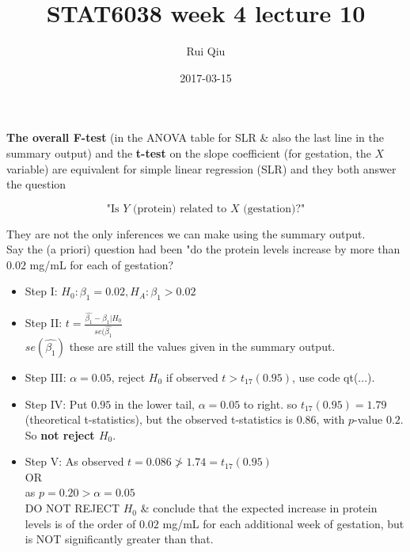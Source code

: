 \documentclass[a4paper, 11pt, twoside]{article}
\begin{document}
\title{STAT6038 week 4 lecture 10}
\author{Rui Qiu}
\date{2017-03-15}

\maketitle

\textbf{The overall F-test} (in the ANOVA table for SLR \& also the last line in the summary output) and the \textbf{t-test} on the slope coefficient (for gestation, the $X$ variable) are equivalent for simple linear regression (SLR) and they both answer the question

\[\text{"Is $Y$ (protein) related to $X$ (gestation)?"}\]

They are not the only inferences we can make using the summary output.\\

Say the (a priori) question had been "do the protein levels increase by more than $0.02$ mg/mL for each of gestation?

\begin{itemize}
	\item Step I: $H_0: \beta_1 = 0.02, H_A : \beta_1 > 0.02$
	\item Step II: $t=\frac{\hat{\beta_1}-\beta_1|H_0}{se(\hat{\beta_1}}$\\
	$se(\hat{\beta_1})$ these are still the values given in the summary output.
	\item Step III: $\alpha=0.05$, reject $H_0$ if observed $t > t_{17}(0.95)$, use code qt(...).
	\item Step IV: Put $0.95$ in the lower tail, $\alpha=0.05$ to right. so $t_{17}(0.95)=1.79$ (theoretical t-statistics), but the observed t-statistics is $0.86$, with $p$-value $0.2$.\\
	So \textbf{not reject $H_0$}.
	\item Step V: As observed $t=0.086 \not > 1.74 = t_{17}(0.95)$\\
	OR\\
	as $p=0.20 > \alpha = 0.05$\\
	DO NOT REJECT $H_0$ \& conclude that the expected increase in protein levels is of the order of $0.02$ mg/mL for each additional week of gestation, but is NOT significantly greater than that. 
\end{itemize}
\end{document}
